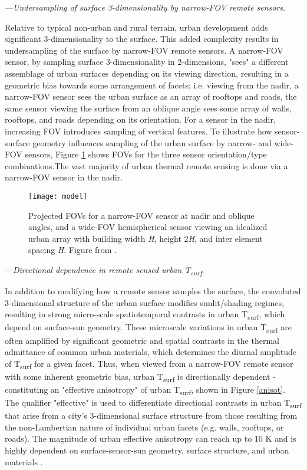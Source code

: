 \begin{bibunit}
\noindent---\textit{Undersampling of surface 3-dimensionality by narrow-FOV remote sensors}. 

Relative to typical non-urban and rural terrain, urban development adds significant 3-dimensionality to the surface. This added complexity results in undersampling of the surface by narrow-FOV remote sensors. A narrow-FOV sensor, by sampling surface 3-dimensionality in 2-dimensions, "sees" a different assemblage of urban surfaces depending on its viewing direction, resulting in a geometric bias towards some arrangement of facets; i.e. viewing from the nadir, a narrow-FOV sensor sees the urban surface as an array of rooftops and roads, the same sensor viewing the surface from an oblique angle sees some array of walls, rooftops, and roads depending on its orientation. For a sensor in the nadir, increasing FOV introduces sampling of vertical features. To illustrate how sensor-surface geometry influences sampling of the urban surface by narrow- and wide-FOV sensors, Figure \ref{model} shows FOVs for the three sensor orientation/type combinations.The vast majority of urban thermal remote sensing is done via a narrow-FOV sensor in the nadir.

\begin{figure}[H]
	\centering
	\texttt{[image: model]}
	\caption{Projected FOVs for a narrow-FOV sensor at nadir and oblique angles, and a wide-FOV hemispherical sensor viewing an idealized urban array with building width \textit{H}, height 2\textit{H}, and inter element spacing \textit{H}. Figure from \cite{Adderley2015}.}
	\label{model}
\end{figure}

\noindent---\textit{Directional dependence in remote sensed urban T\textsubscript{surf}}. 

In addition to modifying how a remote sensor samples the surface, the convoluted 3-dimensional structure of the urban surface modifies sunlit/shading regimes, resulting in strong micro-scale spatiotemporal contrasts in urban T\textsubscript{surf}, which depend on surface-sun geometry. These microscale variations in urban T\textsubscript{surf} are often amplified by significant geometric and spatial contrasts in the thermal admittance of common urban materials, which determines the diurnal amplitude of T\textsubscript{surf} for a given facet. Thus, when viewed from a narrow-FOV remote sensor with some inherent geometric bias, urban T\textsubscript{surf} is directionally dependent - constituting an "effective anisotropy" of urban T\textsubscript{surf}, shown in Figure \ref{anisot}. The qualifier "effective" is used to differentiate directional contrasts in urban T\textsubscript{surf} that arise from a city's 3-dimensional surface structure from those resulting from the non-Lambertian nature of individual urban facets (e.g. walls, rooftops, or roads). The magnitude of urban effective anisotropy can reach up to 10 \si{\kelvin} and is highly dependent on surface-sensor-sun geometry, surface structure, and urban materials \citep{Krayenhoff2016, Voogt1997}. 


\end{bibunit}
